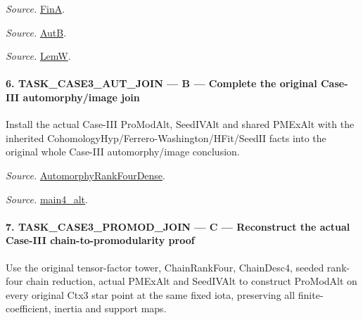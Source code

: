 \emph{Source.} \href{https://github.com/CocoSgt/riemann-hypothesis-lean/blob/7cbf7a0c32fca1badf05931879a37c3f8a2b03b4/src/Development/AutomorphicArithmetic/AutomorphicVarieties/AutomorphicCases/AutomorphyUnramifiedCoefficients.lean#L12-L13}{FinA}.

\emph{Source.} \href{https://github.com/CocoSgt/riemann-hypothesis-lean/blob/7cbf7a0c32fca1badf05931879a37c3f8a2b03b4/src/Development/AutomorphicArithmetic/AutomorphicVarieties/AutomorphicCases/AutomorphyUnramifiedCoefficients.lean#L15-L17}{AutB}.

\emph{Source.} \href{https://github.com/CocoSgt/riemann-hypothesis-lean/blob/7cbf7a0c32fca1badf05931879a37c3f8a2b03b4/src/Development/AutomorphicArithmetic/AutomorphicVarieties/AutomorphicCases/AutomorphyUnramifiedCoefficients.lean#L19-L22}{LemW}.



\paragraph{6. TASK\_\allowbreak CASE3\_\allowbreak AUT\_\allowbreak JOIN — B — Complete the original Case-III automorphy/image join}

Install the actual Case-III ProModAlt, SeedIVAlt and shared PMExAlt with the inherited CohomologyHyp/Ferrero-Washington/HFit/SeedII facts into the original whole Case-III automorphy/image conclusion.

\emph{Source.} \href{https://github.com/CocoSgt/riemann-hypothesis-lean/blob/7cbf7a0c32fca1badf05931879a37c3f8a2b03b4/src/Development/AutomorphicArithmetic/AutomorphicVarieties/ModularityArgument/ThresholdArguments/DenseThresholdCases/PromodularityCaseThree.lean#L43-L44}{AutomorphyRankFourDense}.

\emph{Source.} \href{https://github.com/CocoSgt/riemann-hypothesis-lean/blob/7cbf7a0c32fca1badf05931879a37c3f8a2b03b4/src/Development/AutomorphicArithmetic/AutomorphicVarieties/ModularityArgument/ThresholdArguments/DenseThresholdCases/CuFinal.lean#L44-L44}{main4\_\allowbreak alt}.



\paragraph{7. TASK\_\allowbreak CASE3\_\allowbreak PROMOD\_\allowbreak JOIN — C — Reconstruct the actual Case-III chain-to-promodularity proof}

Use the original tensor-factor tower, ChainRankFour, ChainDesc4, seeded rank-four chain reduction, actual PMExAlt and SeedIVAlt to construct ProModAlt on every original Ctx3 star point at the same fixed iota, preserving all finite-coefficient, inertia and support maps.

